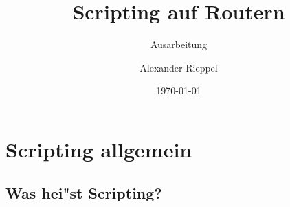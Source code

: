 \documentclass[a4paper,12pt]{scrreprt}
\begin{document}
\author{Alexander Rieppel} %
\title{Scripting auf Routern} %
\subject{NWSY} %
\subtitle{Ausarbeitung} %
\date{\today} %
\publishers{5AHITT} %

\maketitle
\tableofcontents

\chapter{Scripting allgemein}
\section{Was hei"st Scripting?}
\end{document}
